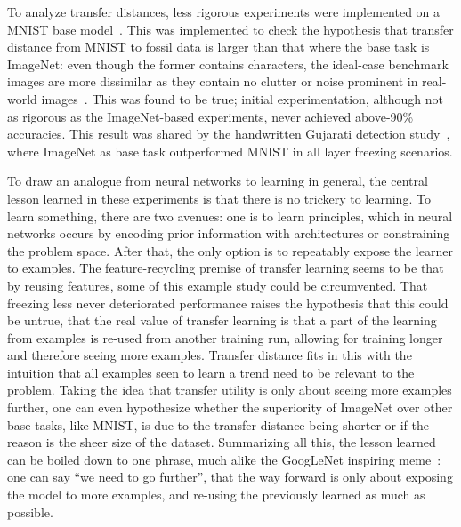 \documentclass[english,twoside,openright]{UH_DS_MSc}
\begin{document}
To analyze transfer distances, less rigorous experiments were implemented on a MNIST base model~\cite{jamilemnist}.
This was implemented to check the hypothesis that transfer distance from MNIST to fossil data is larger than that where 
the base task is ImageNet: even though the former contains characters, the ideal-case benchmark images are more dissimilar 
as they contain no clutter or noise prominent in real-world images~\cite{alexnet}. This was found to be true; 
initial experimentation, although not as rigorous as the ImageNet-based experiments, never achieved above-90\% accuracies.
This result was shared by the handwritten Gujarati detection study~\cite{8goelGujarati2023}, where ImageNet as base task 
outperformed MNIST in all layer freezing scenarios. 

To draw an analogue from neural networks to learning in general, the central lesson learned in these experiments 
is that there is no trickery to learning. To learn something, there are two avenues: one is to learn principles, which in 
neural networks occurs by encoding prior information with architectures or constraining the problem space. After that, the only 
option is to repeatably expose the learner to examples. The feature-recycling premise of transfer learning seems to be that 
by reusing features, some of this example study could be circumvented. That freezing less never deteriorated performance
raises the hypothesis that this could be untrue, that the real value of transfer learning is that a part of the learning from 
examples is re-used from another training run, allowing for training longer and therefore seeing more examples. Transfer distance 
fits in this with the intuition that all examples seen to learn a trend need to be relevant to the problem. 
Taking the idea that transfer utility is only about 
seeing more examples further, one can even hypothesize whether the superiority of ImageNet over other base tasks, like MNIST, is 
due to the transfer distance being shorter or if the reason is the sheer size of the dataset. Summarizing all this, the lesson learned
can be boiled down to one phrase, much alike the GoogLeNet inspiring meme~\cite{we_need_to_go_deeper}: one can say ``we need to go further'', that the way forward is only about exposing the model to more examples, 
and re-using the previously learned as much as possible.
\end{document}
